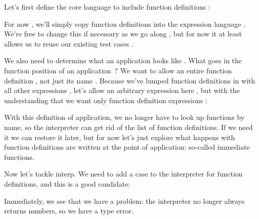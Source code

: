 
Let’s first define the core language  to include function definitions :

For now , we’ll simply copy function definitions  into the expression language . We’re free to change this  if
necessary  as we go along , but for now  it at least  allows us  to reuse
 our existing test cases .

We also need to determine  what an application
looks like . What goes in the function
position of an application \,? We
want to allow an entire function definition , not just its name . Because we’ve lumped function definitions  in with all other expressions , let’s allow an arbitrary expression here , but with the understanding  that we
want only function definition expressions :

With this definition of application, we no longer have to look up functions by
name, so the interpreter can get rid of the list of function definitions. If we
need it we can restore it later, but for now let’s just explore what happens
with function definitions are written at the point of application: so-called
immediate functions.

Now let’s tackle interp. We need to add a case to the interpreter for function
definitions, and this is a good candidate:

Immediately, we see that we have a problem: the interpreter no longer always
returns numbers, so we have a type error.

